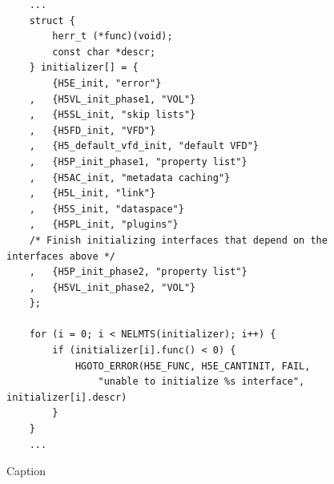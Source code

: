\begin{figure}
\centering
\caption{Caption}
\label{fig:label1}
\begin{verbatim}
    ...
    struct {
        herr_t (*func)(void);
        const char *descr;
    } initializer[] = {
        {H5E_init, "error"}
    ,   {H5VL_init_phase1, "VOL"}
    ,   {H5SL_init, "skip lists"}
    ,   {H5FD_init, "VFD"}
    ,   {H5_default_vfd_init, "default VFD"}
    ,   {H5P_init_phase1, "property list"}
    ,   {H5AC_init, "metadata caching"}
    ,   {H5L_init, "link"}
    ,   {H5S_init, "dataspace"}
    ,   {H5PL_init, "plugins"}
    /* Finish initializing interfaces that depend on the interfaces above */
    ,   {H5P_init_phase2, "property list"}
    ,   {H5VL_init_phase2, "VOL"}
    };

    for (i = 0; i < NELMTS(initializer); i++) {
        if (initializer[i].func() < 0) {
            HGOTO_ERROR(H5E_FUNC, H5E_CANTINIT, FAIL,
                "unable to initialize %s interface", initializer[i].descr)
        }
    }
    ...
\end{verbatim}
\end{figure}